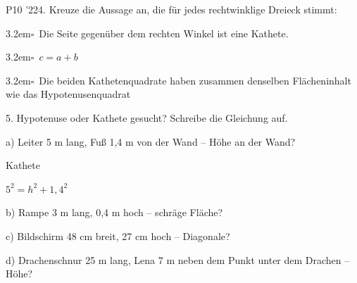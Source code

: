 \documentclass[11pt]{article}
\renewcommand{\pfkreuzzeile}[1]{\par\noindent\hangindent3.2em\hangafter1\hspace*{1.6em}$\square$\ #1\par}
\begin{document}
\begin{pfaufg}{P10 ’22}{4.}{}
Kreuze die Aussage an, die für jedes rechtwinklige Dreieck stimmt:
\pfkreuzzeile{Die Seite gegenüber dem rechten Winkel ist eine Kathete.}\pfkreuzzeile{$c=a+b$}\pfkreuzzeile{Die beiden Kathetenquadrate haben zusammen denselben Flächeninhalt wie das Hypotenusenquadrat}
\end{pfaufg}
\begin{pfaufg}{}{5.}{}
Hypotenuse oder Kathete gesucht? Schreibe die Gleichung auf.\par\smallskip\noindent a) Leiter 5 m lang, Fuß 1,4 m von der Wand – Höhe an der Wand?\par\vspace{2mm}\noindent\hspace*{1.2em}\parbox[b]{0.22\linewidth}{{\color{black!55}Kathete}\par\vspace{-1pt}{\color{black!45}\rule{\linewidth}{0.4pt}}}\hspace{6mm}\parbox[b]{0.45\linewidth}{{\color{black!55}$5^2 = h^2 + 1{,}4^2$}\par\vspace{-1pt}{\color{black!45}\rule{\linewidth}{0.4pt}}}\par\medskip\noindent b) Rampe 3 m lang, 0,4 m hoch – schräge Fläche?\par\vspace{2mm}\noindent\hspace*{1.2em}\parbox[b]{0.22\linewidth}{\par\vspace{-1pt}{\color{black!45}\rule{\linewidth}{0.4pt}}}\hspace{6mm}\parbox[b]{0.45\linewidth}{\par\vspace{-1pt}{\color{black!45}\rule{\linewidth}{0.4pt}}}\par\medskip\noindent c) Bildschirm 48 cm breit, 27 cm hoch – Diagonale?\par\vspace{2mm}\noindent\hspace*{1.2em}\parbox[b]{0.22\linewidth}{\par\vspace{-1pt}{\color{black!45}\rule{\linewidth}{0.4pt}}}\hspace{6mm}\parbox[b]{0.45\linewidth}{\par\vspace{-1pt}{\color{black!45}\rule{\linewidth}{0.4pt}}}\par\medskip\noindent d) Drachenschnur 25 m lang, Lena 7 m neben dem Punkt unter dem Drachen – Höhe?\par\vspace{2mm}\noindent\hspace*{1.2em}\parbox[b]{0.22\linewidth}{\par\vspace{-1pt}{\color{black!45}\rule{\linewidth}{0.4pt}}}\hspace{6mm}\parbox[b]{0.45\linewidth}{\par\vspace{-1pt}{\color{black!45}\rule{\linewidth}{0.4pt}}}
\end{pfaufg}
\end{document}
